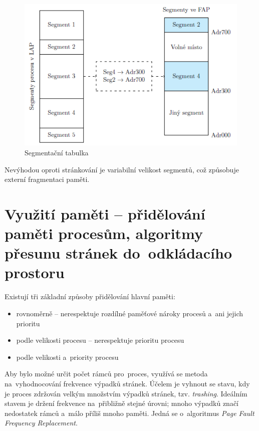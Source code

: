 \begin{figure}[ht]
	\centering
	\includegraphics[scale=1]{images/mem_segment_table.png}
	\caption{Segmentační tabulka}
	\label{mem_segment_table}
\end{figure}

Nevýhodou oproti stránkování je variabilní velikost segmentů, což způsobuje externí fragmentaci paměti.


\clearpage
\section{Využití paměti -- přidělování paměti procesům, algoritmy přesunu stránek do~odkládacího prostoru}

Existují tři základní způsoby přidělování hlavní paměti:
\begin{itemize}
	\item rovnoměrně -- nerespektuje rozdílné paměťové nároky procesů a~ani jejich prioritu
	\item podle velikosti procesu -- nerespektuje prioritu procesu
	\item podle velikosti a~priority procesu
\end{itemize}

Aby bylo možné určit počet rámců pro~proces, využívá se metoda na~vyhodnocování frekvence výpadků stránek. Účelem je vyhnout se stavu, kdy je proces zdržován velkým množstvím výpadků stránek, tzv. \emph{trashing}. Ideálním stavem je držení frekvence na~přibližně stejné úrovni; mnoho výpadků značí nedostatek rámců a~málo příliš mnoho paměti. Jedná se o~algoritmus \emph{Page Fault Frequency Replacement}.

